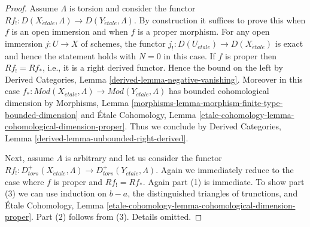 \documentclass{stacks-project}
\theoremstyle{plain}
\theoremstyle{definition}
\theoremstyle{remark}
\numberwithin{equation}{subsection}
\def\etale{{\acute{e}tale}}
\begin{document}
\begin{proof}
Assume $\Lambda$ is torsion and consider the functor
$Rf_! : D(X_\etale, \Lambda) \to D(Y_\etale, \Lambda)$.
By construction it suffices to prove this when $f$ is an open immersion
and when $f$ is a proper morphism. For any open immersion $j : U \to X$
of schemes, the functor $j_! : D(U_\etale) \to D(X_\etale)$ is exact
and hence the statement holds with $N = 0$ in this case.
If $f$ is proper then $Rf_! = Rf_*$, i.e., it is a right derived
functor. Hence the bound on the left by
Derived Categories, Lemma \ref{derived-lemma-negative-vanishing}.
Moreover in this case $f_* : \textit{Mod}(X_\etale, \Lambda)
\to \textit{Mod}(Y_\etale, \Lambda)$ has bounded cohomological dimension by
Morphisms, Lemma \ref{morphisms-lemma-morphism-finite-type-bounded-dimension}
and \'Etale Cohomology, Lemma
\ref{etale-cohomology-lemma-cohomological-dimension-proper}.
Thus we conclude by
Derived Categories, Lemma \ref{derived-lemma-unbounded-right-derived}.

\medskip\noindent
Next, assume $\Lambda$ is arbitrary and let us consider the functor
$Rf_! : D^+_{tors}(X_\etale, \Lambda) \to D^+_{tors}(Y_\etale, \Lambda)$.
Again we immediately reduce to the case where $f$ is proper and
$Rf_! = Rf_*$. Again part (1) is immediate. To show part (3)
we can use induction on $b - a$, the distinguished
triangles of trunctions, and \'Etale Cohomology, Lemma
\ref{etale-cohomology-lemma-cohomological-dimension-proper}.
Part (2) follows from (3). Details omitted.
\end{proof}
\end{document}
